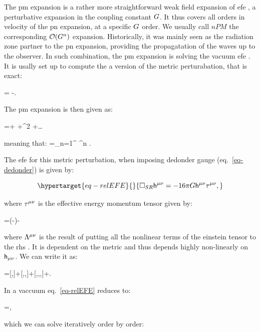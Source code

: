 \documentclass[
  10pt,
  a4paper,
  DIV=11,
  numbers=noendperiod,
  twoside]{scrreprt}
\let\[\relax \let\]\relax %
\DeclareRobustCommand{\[}{\begin{equation}}
\DeclareRobustCommand{\]}{\end{equation}}
\begin{document}
The \gls{pm} expansion is a rather more straightforward weak field
expansion of \gls{efe} , a perturbative expansion in the coupling
constant \(\grav\). It thus covers all orders in velocity of the
\gls{pn} expansion, at a specific \(\grav\) order. We usually call
\(nPM\) the corresponding \(\order[n]{\grav}\) expansion. Historically,
it was mainly seen as the radiation zone partner to the \gls{pn}
expansion, providing the propagatation of the waves up to the observer.
In such combination, the \gls{pm} expansion is solving the vacuum
\gls{efe} . It is usally set up to compute the a version of the metric
perturabation, that is exact:

\[\pertmet=\sqrt{-\metricTensor} \invmet-\invmink.\]

The \gls{pm} expansion is then given as:

\[
\sqrt{-\metricTensor} \invmet=\invmink+ \grav {}+\grav^2 +\ldots
\]

meaning that: \[
\invpertmet=\sum\limits_{n=1}^{\infty} \grav^n  .
\]

The \gls{efe} for this metric perturbation, when imposing dedonder gauge
(eq.~\ref{eq-dedonder}) is given by:

\begin{equation}\protect\hypertarget{eq-relEFE}{}{
\SRDA \invpertmet=-16 \pi \grav \invpertmet \relSEct ,
}\label{eq-relEFE}\end{equation}

where \(\relSEct\) is the effective energy momentum tensor given by:

\[
\relSEct=(-\metricTensor)\SEct -\inv{16 \pi \grav}\ct[\mu\nu]{\Lambda}
\]

where \(\ct[\mu\nu]{\Lambda}\) is the result of putting all the
nonlinear terms of the einstein tensor to the \gls{rhs} . It is
dependent on the metric and thus depends highly non-linearly on
\(\pertmet\). We can write it as:

\[
\ct[\mu\nu]{\Lambda}=[\pertTensor,\pertTensor]+[\pertTensor,\pertTensor,\pertTensor]+[\pertTensor,\pertTensor,\pertTensor,\pertTensor]+\order[5]{\pertTensor}.
\]

In a vaccuum eq.~\ref{eq-relEFE} reduces to:

\[
\SRDA \invpertmet=\ct[\mu\nu]{\Lambda},
\]

which we can solve iteratively order by order:
\end{document}
